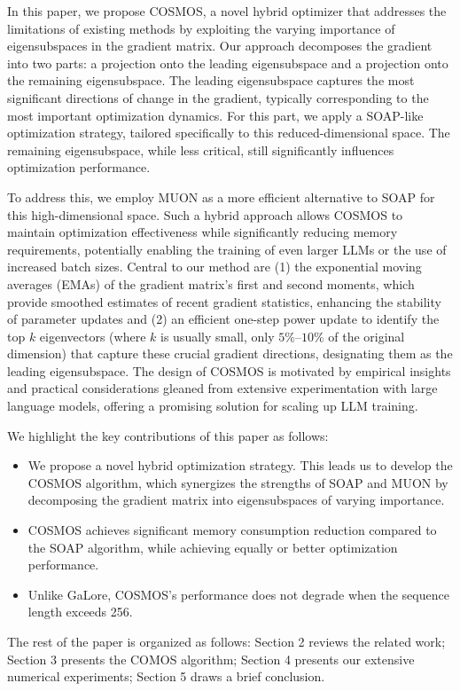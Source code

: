 In this paper, we propose COSMOS, a novel hybrid optimizer that addresses the limitations of existing methods by exploiting the varying importance of eigensubspaces in the gradient matrix. Our approach decomposes the gradient into two parts: a projection onto the leading eigensubspace and a projection onto the remaining eigensubspace. The leading eigensubspace captures the most significant directions of change in the gradient, typically corresponding to the most important optimization dynamics. For this part, we apply a SOAP-like optimization strategy, tailored specifically to this reduced-dimensional space. The remaining eigensubspace, while less critical, still significantly influences optimization performance.

To address this, we employ MUON as a more efficient alternative to SOAP for this high-dimensional space. Such a hybrid approach allows COSMOS to maintain optimization effectiveness while significantly reducing memory requirements, potentially enabling the training of even larger LLMs or the use of increased batch sizes. Central to our method are (1) the exponential moving averages (EMAs) of the gradient matrix's first and second moments, which provide smoothed estimates of recent gradient statistics, enhancing the stability of parameter updates and (2) an efficient one-step power update to identify the top $k$ eigenvectors (where $k$ is usually small, only $5\%$--$10\%$ of the original dimension) that capture these crucial gradient directions, designating them as the leading eigensubspace. 
The design of COSMOS is motivated by empirical insights and practical considerations gleaned from extensive experimentation with large language models, offering a promising solution for scaling up LLM training.

We highlight the key contributions of this paper as follows:

\begin{itemize}
\item We propose a novel hybrid optimization strategy. This leads us to develop the COSMOS algorithm, which synergizes the strengths of SOAP and MUON by decomposing the gradient matrix into eigensubspaces of varying importance.

\item COSMOS achieves significant memory consumption reduction compared to the SOAP algorithm, while achieving equally or better optimization performance.

\item Unlike GaLore, COSMOS's performance does not degrade when the sequence length exceeds 256.
\end{itemize}

The rest of the paper is organized as follows: Section 2 reviews the related work; Section 3 presents the COMOS algorithm; Section 4 presents our extensive numerical experiments; Section 5 draws a brief conclusion.
